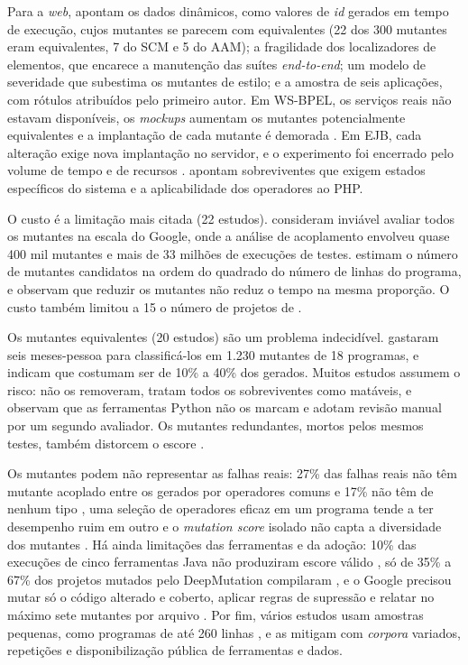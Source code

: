 Para a \textit{web},  apontam os dados dinâmicos, como valores de \textit{id} gerados em tempo de execução, cujos mutantes se parecem com equivalentes (22 dos 300 mutantes eram equivalentes, 7 do SCM e 5 do AAM); a fragilidade dos localizadores de elementos, que encarece a manutenção das suítes \textit{end-to-end}; um modelo de severidade que subestima os mutantes de estilo; e a amostra de seis aplicações, com rótulos atribuídos pelo primeiro autor. Em WS-BPEL, os serviços reais não estavam disponíveis, os \textit{mockups} aumentam os mutantes potencialmente equivalentes e a implantação de cada mutante é demorada \cite{esterobotaro2010}. Em EJB, cada alteração exige nova implantação no servidor, e o experimento foi encerrado pelo volume de tempo e de recursos \cite{nica2011}.  apontam sobreviventes que exigem estados específicos do sistema e a aplicabilidade dos operadores ao PHP.

O custo é a limitação mais citada (22 estudos).  consideram inviável avaliar todos os mutantes na escala do Google, onde a análise de acoplamento envolveu quase 400 mil mutantes e mais de 33 milhões de execuções de testes.  estimam o número de mutantes candidatos na ordem do quadrado do número de linhas do programa, e  observam que reduzir os mutantes não reduz o tempo na mesma proporção. O custo também limitou a 15 o número de projetos de .

Os mutantes equivalentes (20 estudos) são um problema indecidível.  gastaram seis meses-pessoa para classificá-los em 1.230 mutantes de 18 programas, e  indicam que costumam ser de 10\% a 40\% dos gerados. Muitos estudos assumem o risco:  não os removeram,  tratam todos os sobreviventes como matáveis, e  observam que as ferramentas Python não os marcam e adotam revisão manual por um segundo avaliador. Os mutantes redundantes, mortos pelos mesmos testes, também distorcem o escore \cite{ashong2026, kurtz2016}.

Os mutantes podem não representar as falhas reais: 27\% das falhas reais não têm mutante acoplado entre os gerados por operadores comuns e 17\% não têm de nenhum tipo \cite{just2014}, uma seleção de operadores eficaz em um programa tende a ter desempenho ruim em outro \cite{kurtz2016} e o \textit{mutation score} isolado não capta a diversidade dos mutantes \cite{ashong2026}. Há ainda limitações das ferramentas e da adoção: 10\% das execuções de cinco ferramentas Java não produziram escore válido \cite{ramler2012}, só de 35\% a 67\% dos projetos mutados pelo DeepMutation compilaram \cite{tufano2020}, e o Google precisou mutar só o código alterado e coberto, aplicar regras de supressão e relatar no máximo sete mutantes por arquivo \cite{petrovic2021}. Por fim, vários estudos usam amostras pequenas, como programas de até 260 linhas \cite{assylbekov2013}, e as mitigam com \textit{corpora} variados, repetições e disponibilização pública de ferramentas e dados.


